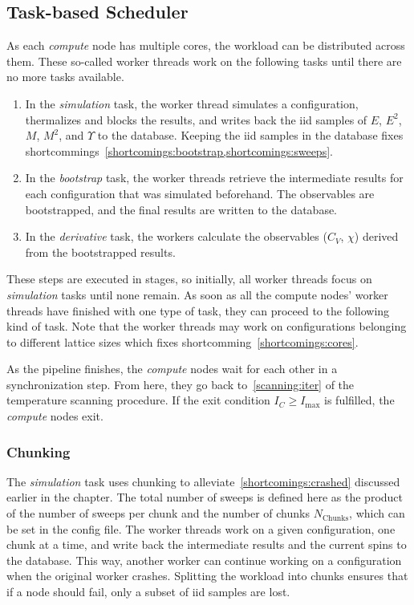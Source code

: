 \subsection{Task-based Scheduler}\label{sec:impl:tasks}
	As each \emph{compute} node has multiple cores, the workload can be distributed across them. These so-called worker threads work on the following tasks until there are no more tasks available.
	\begin{enumerate}
		\item In the \emph{simulation} task, the worker thread simulates a configuration, thermalizes and blocks the results, and writes back the iid samples of $E$, $E^2$, $M$, $M^2$, and $\Upsilon$ to the database. Keeping the iid samples in the database fixes shortcommings~\cref{shortcomings:bootstrap,shortcomings:sweeps}.
		\item In the \emph{bootstrap} task, the worker threads retrieve the intermediate results for each configuration that was simulated beforehand. The observables are bootstrapped, and the final results are written to the database.
		\item In the \emph{derivative} task, the workers calculate the observables ($C_V$, $\chi$) derived from the bootstrapped results.
	\end{enumerate}
	These steps are executed in stages, so initially, all worker threads focus on \emph{simulation} tasks until none remain. As soon as all the compute nodes' worker threads have finished with one type of task, they can proceed to the following kind of task. Note that the worker threads may work on configurations belonging to different lattice sizes which fixes shortcomming~\cref{shortcomings:cores}.
	
	As the pipeline finishes, the \emph{compute} nodes wait for each other in a synchronization step. From here, they go back to~\cref{scanning:iter} of the temperature scanning procedure. If the exit condition $I_C \ge I_\text{max}$ is fulfilled, the \emph{compute} nodes exit.

	\subsubsection{Chunking}\label{sec:impl:tasks:chunks}
		The \emph{simulation} task uses chunking to alleviate~\cref{shortcomings:crashed} discussed earlier in the chapter. The total number of sweeps is defined here as the product of the number of sweeps per chunk and the number of chunks $N_\text{Chunks}$, which can be set in the config file. The worker threads work on a given configuration, one chunk at a time, and write back the intermediate results and the current spins to the database. This way, another worker can continue working on a configuration when the original worker crashes. Splitting the workload into chunks ensures that if a node should fail, only a subset of iid samples are lost.

